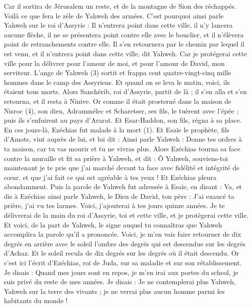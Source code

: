 \begin{multicols}{2}
Car il sortira de Jérusalem un reste, et de la montagne de Sion des réchappés. Voilà ce que fera le zèle de Yahweh des armées.
C'est pourquoi ainsi parle Yahweh sur le roi d’Assyrie : Il n'entrera point dans cette ville, il n'y lancera aucune flèche, il ne se présentera point contre elle avec le bouclier, et il n’élèvera point de retranchements contre elle.
Il s'en retournera par le chemin par lequel il est venu, et il n'entrera point dans cette ville, dit Yahweh.
Car je protégerai cette ville pour la délivrer pour l'amour de moi, et pour l'amour de David, mon serviteur.
L’ange de Yahweh (3) sortit et frappa cent quatre-vingt-cinq mille hommes dans le camp des Assyriens. Et quand on se leva le matin, voici, ils étaient tous morts.
Alors Sanchérib, roi d’Assyrie, partit de là ; il s'en alla et s'en retourna, et il resta à Ninive.
Or comme il était prosterné dans la maison de Nisroc (4), son dieu, Adrammélec et Scharetser, ses fils, le tuèrent avec l'épée ; puis ils s’enfuirent au pays d'Ararat. Et Esar-Haddon, son fils, régna à sa place.
\VerseOne{}En ces jours-là, Ezéchias fut malade à la mort (1). Et Esaïe le prophète, fils d'Amots, vint auprès de lui, et lui dit : Ainsi parle Yahweh : Donne tes ordres à ta maison, car tu vas mourir et tu ne vivras plus.
Alors Ezéchias tourna sa face contre la muraille et fit sa prière à Yahweh,
et dit : Ô Yahweh, souviens-toi maintenant je te prie que j'ai marché devant ta face avec fidélité et intégrité de cœur, et que j'ai fait ce qui est agréable à tes yeux ! Et Ezéchias pleura abondamment.
Puis la parole de Yahweh fut adressée à Esaïe, en disant :
Va, et dis à Ezéchias ainsi parle Yahweh, le Dieu de David, ton père : J'ai exaucé ta prière, j'ai vu tes larmes. Voici, j’ajouterai à tes jours quinze années.
Je te délivrerai de la main du roi d’Assyrie, toi et cette ville, et je protègerai cette ville.
Et voici, de la part de Yahweh, le signe auquel tu connaîtras que Yahweh accomplira la parole qu'il a prononcée.
Voici, je m’en vais faire retourner de dix degrés en arrière avec le soleil l'ombre des degrés qui est descendue sur les degrés d'Achaz. Et le soleil recula de dix degrés sur les degrés où il était descendu.
Or c'est ici l'écrit d'Ezéchias, roi de Juda, sur sa maladie et sur son rétablissement.
Je disais : Quand mes jours sont en repos, je m'en irai aux portes du scheol, je suis privé du reste de mes années.
Je disais : Je ne contemplerai plus Yahweh, Yahweh sur la terre des vivants ; je ne verrai plus aucun homme parmi les habitants du monde !

\end{multicols}
